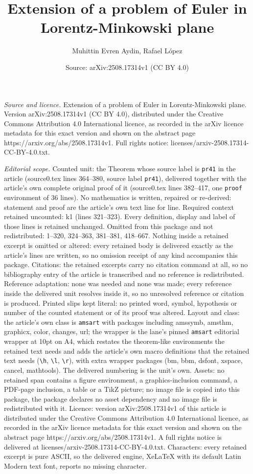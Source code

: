 \documentclass[10pt,a4paper]{amsart}
\title[Extension of a problem of Euler in Lorentz-Minkowski plane]{Extension of a problem of Euler in Lorentz-Minkowski plane}
\author{Muhittin Evren Aydin, Rafael L\'opez}
\date{Source: arXiv:2508.17314v1 (CC BY 4.0)}
\begin{document}
\maketitle

\noindent\emph{Source and licence.} Extension of a problem of Euler in Lorentz-Minkowski plane. Version arXiv:2508.17314v1 (CC BY 4.0), distributed under the Creative Commons Attribution 4.0 International licence, as recorded in the arXiv licence metadata for this exact version and shown on the abstract page https://arxiv.org/abs/2508.17314v1. Full rights notice: licenses/arxiv-2508.17314-CC-BY-4.0.txt.\par\smallskip

\noindent\textit{Editorial scope.} Counted unit: the Theorem whose source label is \texttt{pr41} in the article (source0.tex lines 364--380, source label \texttt{pr41}), delivered together with the article's own complete original proof of it (source0.tex lines 382--417, one \texttt{proof} environment of 36 lines). No mathematics is written, repaired or re-derived: statement and proof are the article's own text line for line. Required context retained uncounted: k1 (lines 321--323). Every definition, display and label of those lines is retained unchanged. Omitted from this package and not redistributed: 1--320, 324--363, 381--381, 418--667. Nothing inside a retained excerpt is omitted or altered: every retained body is delivered exactly as the article's lines are written, so no omission receipt of any kind accompanies this package. Citations: the retained excerpts carry no citation command at all, so no bibliography entry of the article is transcribed and no reference is redistributed. Reference adaptation: none was needed and none was made; every reference inside the delivered unit resolves inside it, so no unresolved reference or citation is produced. Printed slips kept literal: no printed word, symbol, hypothesis or number of the counted statement or of its proof was altered. Layout and class: the article's own class is \texttt{amsart} with packages including amssymb, amsthm, graphicx, color, changes, url; the wrapper is the lane's pinned \texttt{amsart} editorial wrapper at 10pt on A4, which restates the theorem-like environments the retained text needs and adds the article's own macro definitions that the retained text needs (\texttt{\textbackslash h}, \texttt{\textbackslash l}, \texttt{\textbackslash r}), with extra wrapper packages (bm, bbm, dsfont, xspace, cancel, mathtools). The delivered numbering is the unit's own. Assets: no retained span contains a figure environment, a graphics-inclusion command, a PDF-page inclusion, a table or a TikZ picture; no image file is copied into this package, the package declares no asset dependency and no image file is redistributed with it. Licence: version arXiv:2508.17314v1 of this article is distributed under the Creative Commons Attribution 4.0 International licence, as recorded in the arXiv licence metadata for this exact version and shown on the abstract page https://arxiv.org/abs/2508.17314v1. A full rights notice is delivered at licenses/arxiv-2508.17314-CC-BY-4.0.txt. Characters: every retained excerpt is pure ASCII, so the delivered engine, XeLaTeX with its default Latin Modern text font, reports no missing character.
\end{document}
